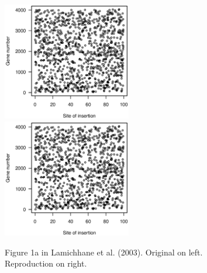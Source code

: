 \begin{figure}
\includegraphics[viewport=133 224 464 528, width=0.50\textwidth]{../original/Nov02/R/Figs/fig1.ps}
\hfill
\includegraphics[viewport=133 224 464 528, width=0.50\textwidth]{../reproduction/Figs/fig1.ps}

\caption{Figure 1a in Lamichhane et al. (2003). Original on left. Reproduction on right.}
\end{figure}

